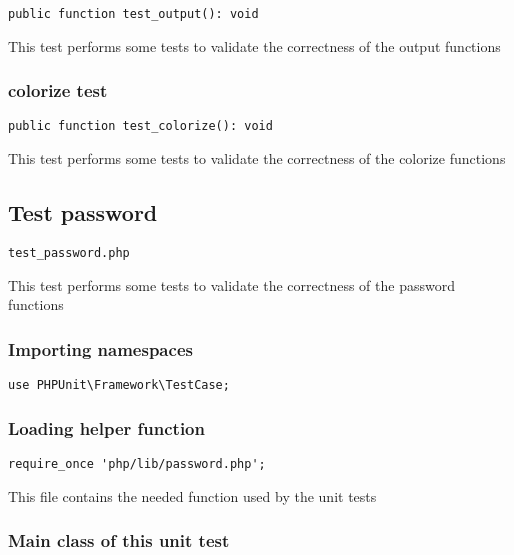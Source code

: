 \documentclass[a4paper]{article}
\begin{document}
\begin{lstlisting}
public function test_output(): void
\end{lstlisting}

This test performs some tests to validate the correctness
of the output functions

\hypertarget{toc284}{}
\subsubsection{colorize test}

\begin{lstlisting}
public function test_colorize(): void
\end{lstlisting}

This test performs some tests to validate the correctness
of the colorize functions

\hypertarget{toc285}{}
\subsection{Test password}

\begin{lstlisting}
test_password.php
\end{lstlisting}

This test performs some tests to validate the correctness
of the password functions

\hypertarget{toc286}{}
\subsubsection{Importing namespaces}

\begin{lstlisting}
use PHPUnit\Framework\TestCase;
\end{lstlisting}

\hypertarget{toc287}{}
\subsubsection{Loading helper function}

\begin{lstlisting}
require_once 'php/lib/password.php';
\end{lstlisting}

This file contains the needed function used by the unit tests

\hypertarget{toc288}{}
\subsubsection{Main class of this unit test}
\end{document}
